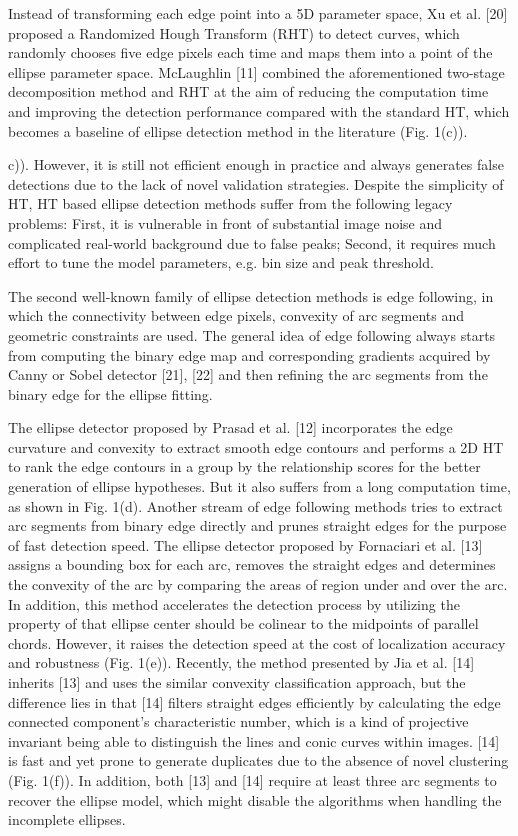 \documentclass[a4paper]{report}
\begin{document}
Instead of transforming each edge point into
a 5D parameter space, Xu et al. [20] proposed a Randomized
Hough Transform (RHT) to detect curves, which randomly
chooses five edge pixels each time and maps them into a point
of the ellipse parameter space. McLaughlin [11] combined the
aforementioned two-stage decomposition method and RHT
at the aim of reducing the computation time and improving
the detection performance compared with the standard HT,
which becomes a baseline of ellipse detection method in the
literature (Fig. 1(c)).

c)). However, it is still not efficient enough in
practice and always generates false detections due to the lack
of novel validation strategies. Despite the simplicity of HT,
HT based ellipse detection methods suffer from the following
legacy problems: First, it is vulnerable in front of substantial
image noise and complicated real-world background due to
false peaks; Second, it requires much effort to tune the model
parameters, e.g. bin size and peak threshold.

The second well-known family of ellipse detection methods
is edge following, in which the connectivity between edge
pixels, convexity of arc segments and geometric constraints are
used. The general idea of edge following always starts from
computing the binary edge map and corresponding gradients
acquired by Canny or Sobel detector [21], [22] and then
refining the arc segments from the binary edge for the ellipse
fitting.

The
ellipse detector proposed by Prasad et al. [12] incorporates the
edge curvature and convexity to extract smooth edge contours
and performs a 2D HT to rank the edge contours in a group
by the relationship scores for the better generation of ellipse
hypotheses. But it also suffers from a long computation time,
as shown in Fig. 1(d).
Another stream of edge following methods tries to extract
arc segments from binary edge directly and prunes straight
edges for the purpose of fast detection speed. The ellipse
detector proposed by Fornaciari et al. [13] assigns a bounding
box for each arc, removes the straight edges and determines
the convexity of the arc by comparing the areas of region
under and over the arc. In addition, this method accelerates
the detection process by utilizing the property of that ellipse
center should be colinear to the midpoints of parallel chords.
However, it raises the detection speed at the cost of localization
accuracy and robustness (Fig. 1(e)). Recently, the method
presented by Jia et al. [14] inherits [13] and uses the similar
convexity classification approach, but the difference lies in
that [14] filters straight edges efficiently by calculating the
edge connected component’s characteristic number, which is a
kind of projective invariant being able to distinguish the lines
and conic curves within images. [14] is fast and yet prone
to generate duplicates due to the absence of novel clustering
(Fig. 1(f)). In addition, both [13] and [14] require at least three
arc segments to recover the ellipse model, which might disable
the algorithms when handling the incomplete ellipses.
\end{document}
